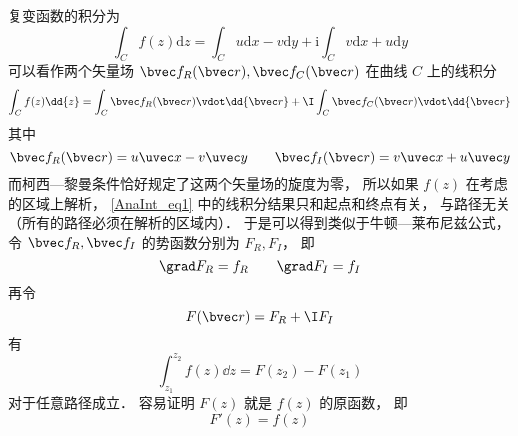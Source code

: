 
\begin{issues}
\issueDraft
\end{issues}

复变函数的积分为
\begin{equation}
\int_{C} f(z) \mathrm{d} z=\int_{C} u \mathrm{d} x-v \mathrm{d} y+\mathrm{i} \int_{C} v \mathrm{d} x+u \mathrm{d} y
\end{equation}
可以看作两个矢量场 $\bvec f_R(\bvec r), \bvec f_C(\bvec r)$ 在曲线 $C$ 上的线积分
\begin{equation}\label{AnaInt_eq1}
\int_{C} f(z) \dd{z} = \int_C \bvec f_R(\bvec r) \vdot \dd{\bvec r} + \I \int_C \bvec f_C(\bvec r) \vdot \dd{\bvec r}
\end{equation}
其中
\begin{equation}
\bvec f_R(\bvec r) = u\uvec x - v\uvec y
\qquad
\bvec f_I(\bvec r) = v\uvec x + u\uvec y
\end{equation}
而柯西—黎曼条件恰好规定了这两个矢量场的旋度为零， 所以如果 $f(z)$ 在考虑的区域上解析， \autoref{AnaInt_eq1} 中的线积分结果只和起点和终点有关， 与路径无关（所有的路径必须在解析的区域内）． 于是可以得到类似于牛顿—莱布尼兹公式， 令 $\bvec f_R, \bvec f_I$ 的势函数分别为 $F_R, F_I$， 即
\begin{equation}
\grad F_R = f_R
\qquad
\grad F_I = f_I
\end{equation}
再令
\begin{equation}
F(\bvec r) = F_R + \I F_I
\end{equation}
有
\begin{equation}\label{AnaInt_eq2}
\int_{z_1}^{z_2} f(z) \dd{z} = F(z_2) - F(z_1)
\end{equation}
对于任意路径成立． 容易证明 $F(z)$ 就是 $f(z)$ 的原函数， 即
\begin{equation}
F'(z) = f(z)
\end{equation}
